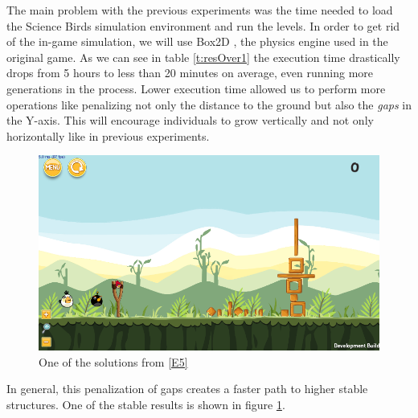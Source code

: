\documentclass[sigconf]{acmart}
\begin{document}
The main problem with the previous experiments was the time needed to
load the Science Birds simulation environment and run the levels.
In order to get rid of the in-game simulation, we will use Box2D
\cite{catto2011box2d}, %
the physics engine used in the original game.
As we can see in table \ref{t:resOver1} the execution time drastically
drops from 5 hours to less than 20 minutes on average, even running
more generations in the process.
Lower execution time allowed us to perform more operations like penalizing
not only the distance to the ground but also the \textit{gaps} in the
Y-axis.
This will encourage individuals to grow vertically and not only horizontally
like in previous experiments.
%
 \begin{figure}
 	\centering
 	\includegraphics[scale=0.3]{E5.png}
 	\caption{One of the solutions from \ref{E5}}\label{f:e5}
      \end{figure}

In general, this penalization of gaps creates a faster path to higher stable
structures.
One of the stable results is shown in figure \ref{f:e5}.
\end{document}
